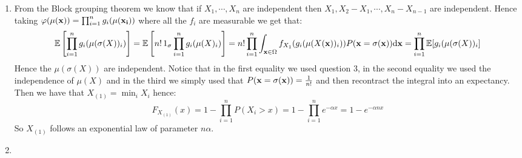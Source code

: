 \documentclass[10pt,a4paper]{article}
\begin{document}
\begin{enumerate}
\item From the Block grouping theorem we know that if $X_1, \cdots, X_n$ are independent then $X_1, X_2 - X_1, \cdots, X_{n} - X_{n-1}$ are independent. Hence taking $\varphi(\mu(\vb{x})) = \prod_{i = 1}^n g_i(\mu(\vb{x_i}))$ where all the $f_i$ are measurable we get that:
\[
\mathbb{E}\left[\prod_{i = 1}^n g_i(\mu(\sigma(X))_i)\right] = \mathbb{E}\left[ n!\, 1_\sigma \prod_{i = 1}^n g_i(\mu(X)_i)\right] = n! \prod_{i = 1}^n \int_{\vb{x} \in \Omega} f_{X_1}(g_i(\mu(X(\vb{x}))_i)) P(\vb{x} = \sigma(\vb{x})) \dd \vb{x} = \prod_{i = 1}^n \mathbb{E}[g_i(\mu(\sigma(X))_i] 
\] 
Hence the $\mu(\sigma(X))$ are independent. Notice that in the first equality we used question 3, in the second equality we used the independence of $\mu(X)$ and in the third we simply used that $P(\vb{x} = \sigma(\vb{x})) = \frac{1}{n!}$ and then recontract the integral into an expectancy.
Then we have that $X_{(1)} = \min_i X_i$ hence:
\[
F_{X_{(1)}}(x) = 1 - \prod_{i = 1}^n P(X_i > x) = 1 - \prod_{i = 1}^n e^{- \alpha x} = 1 - e^{- \alpha n x}
\]
So $X_{(1)}$ follows an exponential law of parameter $n \alpha$. 

\item 

\end{enumerate}
\end{document}
